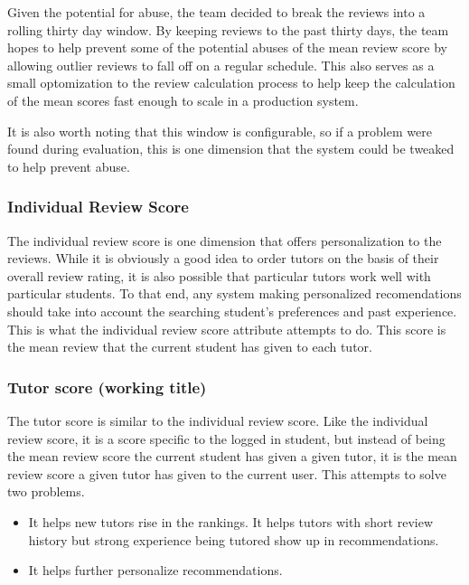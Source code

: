 Given the potential for abuse, the team decided to break the reviews into a
rolling thirty day window.  By keeping reviews to the past thirty days, the
team hopes to help prevent some of the potential abuses of the mean review
score by allowing outlier reviews to fall off on a regular schedule.  This
also serves as a small optomization to the review calculation process to help
keep the calculation of the mean scores fast enough to scale in a production
system.

It is also worth noting that this window is configurable, so if a problem were
found during evaluation, this is one dimension that the system could be
tweaked to help prevent abuse.

\subsubsection{Individual Review Score}
The individual review score is one dimension that offers personalization to
the reviews.  While it is obviously a good idea to order tutors on the basis
of their overall review rating, it is also possible that particular tutors
work well with particular students.  To that end, any system making
personalized recomendations should take into account the searching student's
preferences and past experience.  This is what the individual review score
attribute attempts to do.  This score is the mean review that the current
student has given to each tutor.  

\subsubsection{Tutor score (working title)} %

The tutor score is similar to the individual review score.  Like the
individual review score, it is a score specific to the logged in student, but
instead of being the mean review score the current student has given a given
tutor, it is the mean review score a given tutor has given to the current
user.  This attempts to solve two problems.

\begin{itemize}
\item It helps new tutors rise in the rankings.
  It helps tutors with short review history but strong experience being
  tutored show up in recommendations.
\item It helps further personalize recommendations.
\end{itemize}

